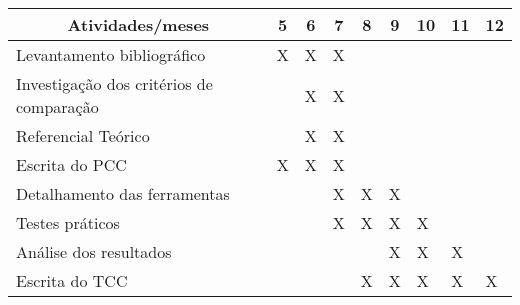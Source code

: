 \begin{center}
\begin{tabular}{|l|l|l|l|l|l|l|l|l|}
\hline
\multicolumn{1}{|c|}{Atividades/meses}   & \multicolumn{1}{c|}{5} & \multicolumn{1}{c|}{6} & \multicolumn{1}{c|}{7} & \multicolumn{1}{c|}{8} & \multicolumn{1}{c|}{9} & \multicolumn{1}{c|}{10} & \multicolumn{1}{c|}{11} & \multicolumn{1}{c|}{12} \\ \hline
Levantamento bibliográfico               & X                      & X                      & X                      &                        &                        &                         &                         &                         \\ \hline
Investigação dos critérios de comparação &                        & X                      & X                      &                        &                        &                         &                         &                         \\ \hline
Referencial Teórico                      &                        & X                      & X                      &                        &                        &                         &                         &                         \\ \hline
Escrita do PCC                           & X                      & X                      & X                      &                        &                        &                         &                         &                         \\ \hline
Detalhamento das ferramentas             &                        &                        & X                      & X                      & X                      &                         &                         &                         \\ \hline
Testes práticos                          &                        &                        & X                      & X                      & X                      & X                       &                         &                         \\ \hline
Análise dos resultados                   &                        &                        &                        &                        & X                      & X                       & X                       &                         \\ \hline
Escrita do TCC                           &                        &                        &                        & X                      & X                      & X                       & X                       & X                       \\ \hline
\end{tabular}
\end{center}